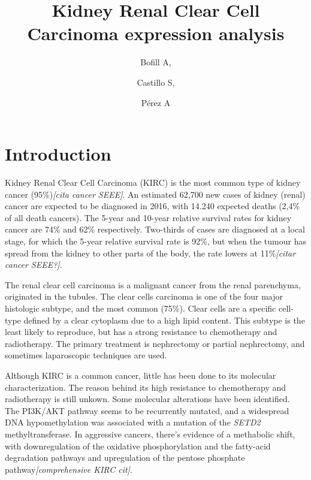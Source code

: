 \documentclass[9pt,twocolumn,twoside]{gsajnl}
\title{Kidney Renal Clear Cell Carcinoma expression analysis}
\author[$\ast$1]{Bofill A,}
\author[$\ast$1]{Castillo S,}
\author[$\ast$1]{Pérez A}
\affil[$\ast$]{Msc in Bioinformatics for Health Sciences, Pompeu Fabra University}
\begin{document}
\maketitle
\thispagestyle{firststyle}
\marginmark
\firstpagefootnote
{}
\vspace{-11pt}%



\section*{Introduction}

Kidney Renal Clear Cell Carcinoma (KIRC) is the most common type of kidney cancer (95\%)\emph{[cita cancer SEEE]}.  An estimated 62,700 new cases of kidney (renal) cancer are expected to be diagnosed in 2016, with 14.240 expected deaths (2,4\% of all death cancers).   The  5-year  and  10-year  relative  survival  rates  for  kidney  
cancer are 74\% and 62\% respectively.  Two-thirds of cases 
 are diagnosed at a local stage, for which the 5-year relative 
survival  rate  is  92\%, but when the tumour has spread from the kidney to other parts of the body, the rate lowers at 11\%\emph{[citar cancer SEEE?]}. 

The renal clear cell carcinoma is a malignant cancer from the renal parenchyma, originated in the tubules. The clear cells carcinoma is one of the four major histologic subtype, and the most common (75\%). Clear cells are a specific cell-type defined by a clear cytoplasm due to a high lipid content. This subtype is the least likely to reproduce, but has a strong resistance to chemotherapy and radiotherapy. The primary treatment is nephrectomy or partial nephrectomy, and sometimes laparoscopic techniques are used. 
	

Although KIRC is a common cancer, little has been done to its molecular characterization. The reason behind its high resistance to chemotherapy and radiotherapy is still unkown. Some molecular alterations have been identified. The PI3K/AKT pathway seems to be recurrently mutated, and a widespread DNA hypomethylation was associated with a mutation of the \textit{SETD2} methyltransferase. In aggressive cancers, there's evidence of a methabolic shift, with downregulation of the oxidative phosphorylation  and the fatty-acid degradation pathways and upregulation of the pentose phosphate pathway\emph{[comprehensive KIRC cit]}.
\end{document}
